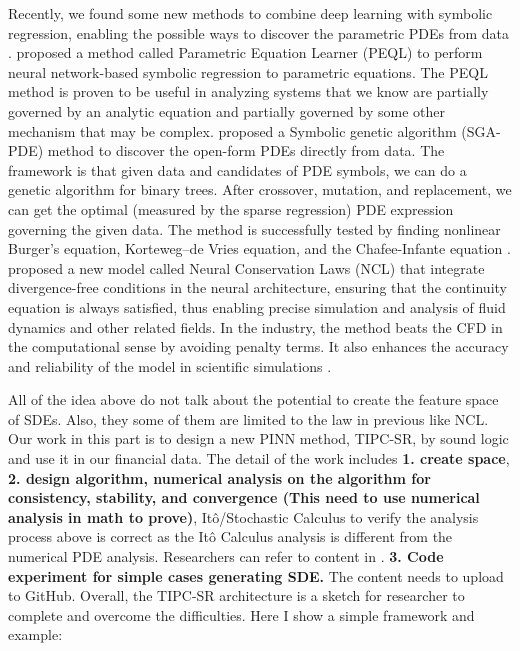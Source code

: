 \documentclass[12pt]{article}
\begin{document}
Recently, we found some new methods to combine deep learning with symbolic regression, enabling the possible ways to discover the parametric PDEs from data \citep{Zhang2022DeepLA}. \citet{Zhang2022DeepLA} proposed a method called Parametric Equation Learner (PEQL) to perform neural network-based symbolic regression to parametric equations. The PEQL method is proven to be useful in analyzing systems that we know are partially governed by an analytic equation and partially governed by some other mechanism that may be complex. \citet{PhysRevResearch.4.023174} proposed a Symbolic genetic algorithm (SGA-PDE) method to discover the open-form PDEs directly from data. The framework is that given data and candidates of PDE symbols, we can do a genetic algorithm for binary trees. After crossover, mutation, and replacement, we can get the optimal (measured by the sparse regression) PDE expression governing the given data. The method is successfully tested by finding nonlinear Burger's equation, Korteweg–de Vries equation, and the Chafee-Infante equation \citep{PhysRevResearch.4.023174}. \citet{richterpowell2022neural} proposed a new model called Neural Conservation Laws (NCL) that integrate divergence-free conditions in the neural architecture, ensuring that the continuity equation is always satisfied, thus enabling precise simulation and analysis of fluid dynamics and other related fields. In the industry, the method beats the CFD in the computational sense by avoiding penalty terms. It also enhances the accuracy and reliability of the model in scientific simulations \citep{richterpowell2022neural}.

All of the idea above do not talk about the potential to create the feature space of SDEs. Also, they some of them are limited to the law in previous like NCL. Our work in this part is to design a new PINN method, TIPC-SR, by sound logic and use it in our financial data. The detail of the work includes {\bf{1. create space}}, {\bf{2. design algorithm, numerical analysis on the algorithm for consistency, stability, and convergence (This need to use numerical analysis in math to prove)}}, Itô/Stochastic Calculus to verify the analysis process above is correct as the Itô Calculus analysis is different from the numerical PDE analysis. Researchers can refer to content in \citet{e2019applied}. {\bf{3. Code experiment for simple cases generating SDE.}} The content needs to upload to GitHub. Overall, the TIPC-SR architecture is a sketch for researcher to complete and overcome the difficulties. Here I show a simple framework and example:\\
\end{document}
